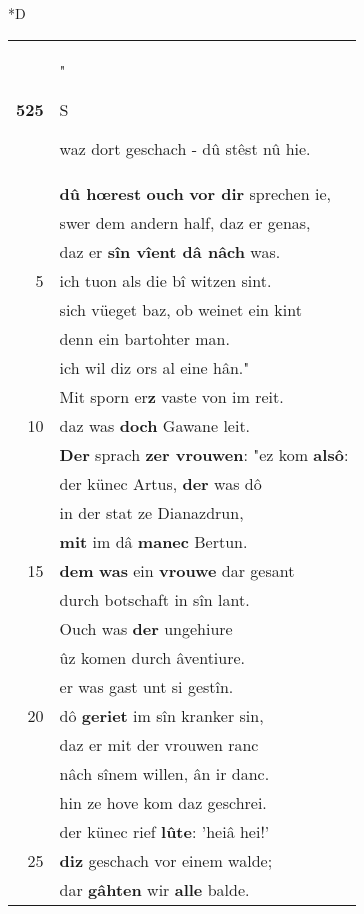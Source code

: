 \documentclass[8pt,a4paper,notitlepage]{article}
\begin{document}
\begin{table}[ht]
\begin{minipage}[t]{0.5\linewidth}
\small
\begin{center}*D
\end{center}
\begin{tabular}{rl}
\textbf{525} & "\begin{large}S\end{large}waz dort geschach - dû stêst nû hie.\\ 
 & \textbf{dû hœrest} \textbf{ouch} \textbf{vor dir} sprechen ie,\\ 
 & swer dem andern half, daz er genas,\\ 
 & daz er \textbf{sîn vîent dâ nâch} was.\\ 
5 & ich tuon als die bî witzen sint.\\ 
 & sich vüeget baz, ob weinet ein kint\\ 
 & denn ein bartohter man.\\ 
 & ich wil diz ors al eine hân."\\ 
 & Mit sporn er\textbf{z} vaste von im reit.\\ 
10 & daz was \textbf{doch} Gawane leit.\\ 
 & \textbf{Der} sprach \textbf{zer vrouwen}: "ez kom \textbf{alsô}:\\ 
 & der künec Artus, \textbf{der} was dô\\ 
 & in der stat ze Dianazdrun,\\ 
 & \textbf{mit} im dâ \textbf{manec} Bertun.\\ 
15 & \textbf{dem} \textbf{was} ein \textbf{vrouwe} dar gesant\\ 
 & durch botschaft in sîn lant.\\ 
 & Ouch was \textbf{der} ungehiure\\ 
 & ûz komen durch âventiure.\\ 
 & er was gast unt si gestîn.\\ 
20 & dô \textbf{geriet} im sîn kranker sin,\\ 
 & daz er mit der vrouwen ranc\\ 
 & nâch sînem willen, ân ir danc.\\ 
 & hin ze hove kom daz geschrei.\\ 
 & der künec rief \textbf{lûte}: 'heiâ hei!'\\ 
25 & \textbf{diz} geschach vor einem walde;\\ 
 & dar \textbf{gâhten} wir \textbf{alle} balde.\\ 

\end{tabular}
\end{minipage}
\end{table}
\end{document}
